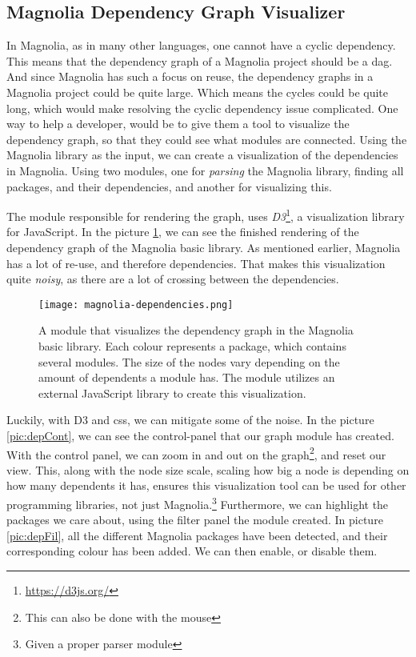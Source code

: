 \subsection{Magnolia Dependency Graph Visualizer}

In Magnolia, as in many other languages, one cannot have a cyclic dependency.
This means that the dependency graph of a Magnolia project should be a
\gls*{dag}. And since Magnolia has such a focus on reuse, the dependency graphs
in a Magnolia project could be quite large. Which means the cycles could be
quite long, which would make resolving the cyclic dependency issue complicated.
One way to help a developer, would be to give them a tool to visualize the
dependency graph, so that they could see what modules are connected. Using the
Magnolia library as the input, we can create a visualization of the dependencies
in Magnolia. Using two modules, one for \textit{parsing} the Magnolia library,
finding all packages, and their dependencies, and another for visualizing
this.

The module responsible for rendering the graph, uses
\textit{D3}\footnote{\url{https://d3js.org/}}, a visualization library for
JavaScript. In the picture \ref{pic:magLib}, we can see the finished rendering
of the dependency graph of the Magnolia basic library. As mentioned earlier,
Magnolia has a lot of re-use, and therefore dependencies. That makes this
visualization quite \textit{noisy}, as there are a lot of crossing between the
dependencies.

\begin{figure}[H]
  \centering
  \texttt{[image: magnolia-dependencies.png]}
  \caption{
    A module that visualizes the dependency graph in the Magnolia basic library.
    Each colour represents a package, which contains several modules. The size
    of the nodes vary depending on the amount of dependents a module has. The
    module utilizes an external JavaScript library to create this visualization.
  }
  \label{pic:magLib}
\end{figure}

Luckily, with D3 and \gls*{css}, we can mitigate some of the noise. In the
picture \ref{pic:depCont}, we can see the control-panel that our graph module
has created. With the control panel, we can zoom in and out on the graph\footnote{This can also be done with the mouse},
and reset our view. This, along with the node size scale, scaling how big
a node is depending on how many dependents it has, ensures this visualization
tool can be used for other programming libraries, not just Magnolia.\footnote{Given a proper parser module}
Furthermore, we can highlight the packages we care about, using the filter
panel the module created. In picture \ref{pic:depFil}, all the different
Magnolia packages have been detected, and their corresponding colour has been
added. We can then enable, or disable them.

